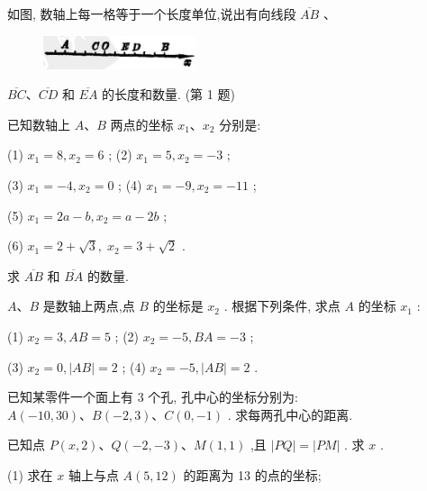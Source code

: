 \documentclass[lang=cn,newtx,10pt,scheme=chinese]{elegantbook}
\begin{document}
\begin{problemset}[习 题 一]

\item 如图, 数轴上每一格等于一个长度单位,说出有向线段 \(\overline{AB}\) 、

\begin{figure}[h]
  \centering
  \includegraphics[max width=0.4\textwidth]{images/01912cc2-ffb6-728e-9ae7-b113ff05c64b_15_328018.jpg}
  \caption{}
\end{figure}

\(\overline{BC}\text{、}\overline{CD}\) 和 \(\overline{EA}\) 的长度和数量. (第 1 题)

\item 已知数轴上 \(A\text{、}B\) 两点的坐标 \({x}_{1}\text{、}{x}_{2}\) 分别是:

(1) \({x}_{1} = 8,{x}_{2} = 6\) ; (2) \({x}_{1} = 5,{x}_{2} = - 3\) ;

(3) \({x}_{1} = - 4,{x}_{2} = 0\) ; (4) \({x}_{1} = - 9,{x}_{2} = - {11}\) ;

(5) \({x}_{1} = {2a} - b,{x}_{2} = a - {2b}\) ;

(6) \({x}_{1} = 2 + \sqrt{3},\;{x}_{2} = 3 + \sqrt{2}\) .

求 \(\overline{AB}\) 和 \(\overline{BA}\) 的数量.

\item \(A\text{、}B\) 是数轴上两点,点 \(B\) 的坐标是 \({x}_{2}\) . 根据下列条件, 求点 \(A\) 的坐标 \({x}_{1}\) :

(1) \({x}_{2} = 3,{AB} = 5\) ; (2) \({x}_{2} = - 5,{BA} = - 3\) ;

(3) \({x}_{2} = 0,\left| {AB}\right| = 2\) ; (4) \({x}_{2} = - 5,\left| {AB}\right| = 2\) .

\item 已知某零件一个面上有 3 个孔, 孔中心的坐标分别为: \(A\left( {-{10},{30}}\right) \text{、}B\left( {-2,3}\right) \text{、}C\left( {0, - 1}\right)\) . 求每两孔中心的距离.

\item 已知点 \(P\left( {x,2}\right) \text{、}Q\left( {-2, - 3}\right) \text{、}M\left( {1,1}\right)\) ,且 \(\left| {PQ}\right| = \left| {PM}\right|\) . 求 \(x\) .

\item (1) 求在 \(x\) 轴上与点 \(A\left( {5,{12}}\right)\) 的距离为 13 的点的坐标;


\end{problemset}
\end{document}
